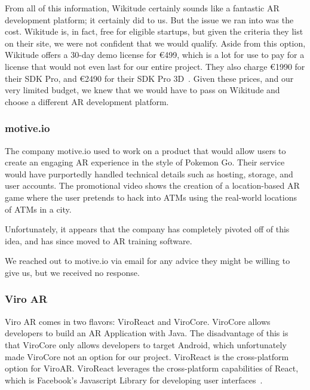 \documentclass[a4paper, 10pt, american, titlepage]{article}
\begin{document}
From all of this information, Wikitude certainly sounds like a fantastic AR
development platform; it certainly did to us. But the issue we ran into was the
cost. Wikitude is, in fact, free for eligible startups, but given the criteria
they list on their site, we were not confident that we would qualify. Aside
from this option, Wikitude offers a 30-day demo license for \euro{499}, which
is a lot for use to pay for a license that would not even last for our entire
project. They also charge \euro{1990} for their SDK Pro, and \euro{2490} for
their SDK Pro 3D~\autocite{wikitude2018}. Given these prices, and our very
limited budget, we knew that we would have to pass on Wikitude and choose a
different AR development platform. 

\subsubsection{motive.io}
\label{sec:motive.io}

The company motive.io used to work on a product that would allow users to
create an engaging AR experience in the style of Pokemon Go. Their service
would have purportedly handled technical details such as hosting, storage, and
user accounts. The promotional video shows the creation of a location-based AR
game where the user pretends to hack into ATMs using the real-world locations
of ATMs in a city\autocite{odom2017}.

Unfortunately, it appears that the company has completely pivoted off of this
idea, and has since moved to AR training software\autocite{motiveio}.

We reached out to motive.io via email for any advice they might be willing to
give us, but we received no response.

\subsubsection{Viro AR}
\label{sec:viroAR}

Viro AR comes in two flavors: ViroReact and ViroCore. ViroCore allows
developers to build an AR Application with Java. The disadvantage of this is
that ViroCore only allows developers to target Android, which unfortunately
made ViroCore not an option for our project. ViroReact is the cross-platform
option for ViroAR. ViroReact leverages the cross-platform capabilities of
React, which is Facebook's Javascript Library for developing user
interfaces~\autocite{facebook2019}.
\end{document}
